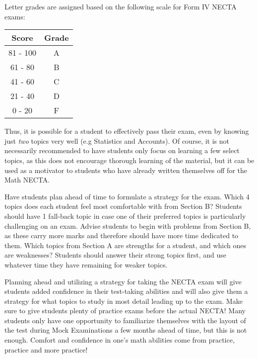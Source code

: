 Letter grades are assigned based on the following scale for Form IV NECTA exams:
\begin{center}
\begin{tabular}{c|c}
Score & Grade \\ \hline
81 - 100 & A \\
61 - 80 & B \\
41 - 60 & C \\
21 - 40 & D \\
0 - 20 & F \\
\end{tabular}
\end{center}

Thus, it is possible for a student to effectively pass their exam, even by knowing just \emph{two} topics very well (e.g Statistics and Accounts). Of course, it is not necessarily recommended to have students only focus on learning a few select topics, as this does not encourage thorough learning of the material, but it can be used as a motivator to students who have already written themselves off for the Math NECTA.

Have students plan ahead of time to formulate a strategy for the exam. Which 4 topics does each student feel most comfortable with from Section B? Students should have 1 fall-back topic in case one of their preferred topics is particularly challenging on an exam. Advise students to begin with problems from Section B, as these carry more marks and therefore should have more time dedicated to them. Which topics from Section A are strengths for a student, and which ones are weaknesses? Students should answer their strong topics first, and use whatever time they have remaining for weaker topics.

Planning ahead and utilizing a strategy for taking the NECTA exam will give students added confidence in their test-taking abilities and will also give them a strategy for what topics to study in most detail leading up to the exam. Make sure to give students plenty of practice exams before the actual NECTA! Many students only have one opportunity to familiarize themselves with the layout of the test during Mock Examinations a few months ahead of time, but this is not enough. Comfort and confidence in one's math abilities come from practice, practice and more practice!

